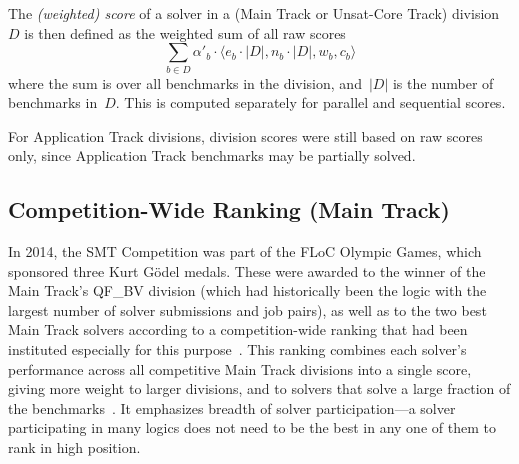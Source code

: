 \documentclass[dvipsnames,table,twoside,11pt]{article}
\newcommand{\maintrack}{Main Track\xspace}
\newcommand{\apptrack}{Application Track\xspace}
\newcommand{\ucoretrack}{Unsat-Core Track\xspace}
\begin{document}
The \emph{(weighted) score} of a solver in a (\maintrack or
\ucoretrack) division~$D$ is then defined as the weighted sum of all
raw scores
%
$$\sum_{b\in D} \alpha'_b \cdot \langle e_b \cdot |D|, n_b \cdot |D|, w_b,
  c_b\rangle$$
%
where the sum is over all benchmarks in the division, and~$|D|$ is the
number of benchmarks in~$D$.  This is computed separately for parallel
and sequential scores.

For \apptrack divisions, division scores were still based on raw
scores only, since \apptrack benchmarks may be partially solved.

\subsection{Competition-Wide Ranking (\maintrack)}
\label{sec:scoring-floc}

In 2014, the SMT Competition was part of the FLoC Olympic Games, which
sponsored three Kurt G\"odel medals.  These were awarded to the winner
of the \maintrack's QF\_BV division (which had historically been the
logic with the largest number of solver submissions and job pairs), as
well as to the two best \maintrack solvers according to a
competition-wide ranking that had been instituted especially for this
purpose~\cite{CDW14}.  This ranking combines each solver's performance
across all competitive \maintrack divisions into a single score,
giving more weight to larger divisions, and to solvers that solve a
large fraction of the benchmarks~\cite{rules18}.  It emphasizes
breadth of solver participation---a solver participating in many
logics does not need to be the best in any one of them to rank in high
position.
\end{document}
